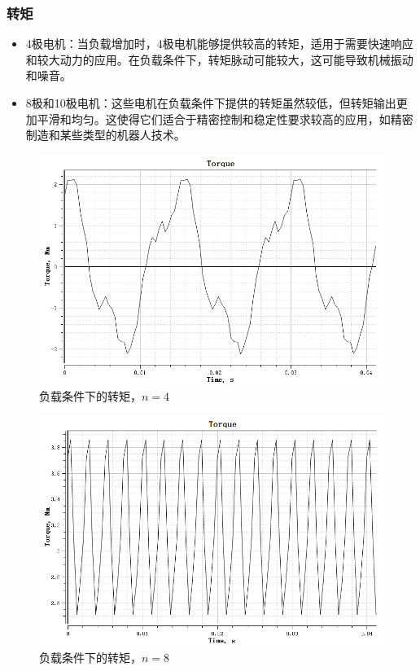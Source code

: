 \documentclass{thuemp}
\begin{document}
\subsubsection{转矩}
\begin{itemize}
	\item 4极电机：当负载增加时，4极电机能够提供较高的转矩，适用于需要快速响应和较大动力的应用。在负载条件下，转矩脉动可能较大，这可能导致机械振动和噪音。
	\item 8极和10极电机：这些电机在负载条件下提供的转矩虽然较低，但转矩输出更加平滑和均匀。这使得它们适合于精密控制和稳定性要求较高的应用，如精密制造和某些类型的机器人技术。
\end{itemize}

\begin{figure}[H]
  \centering
  \includegraphics[width=1\linewidth]{./img/task3/torque-n4-load.png}
  \caption{负载条件下的转矩，$n=4$}
\end{figure}
\begin{figure}[H]
  \centering
  \includegraphics[width=1\linewidth]{./img/task3/torque-n8-load.png}
  \caption{负载条件下的转矩，$n=8$}
\end{figure}
\end{document}
